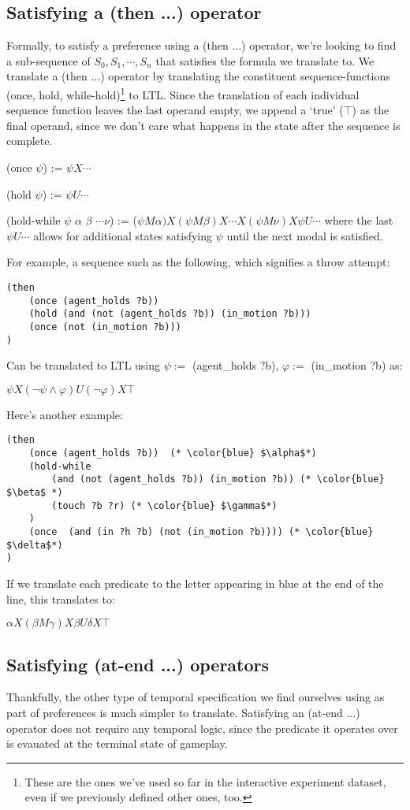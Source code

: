 \documentclass{article}
\begin{document}
\subsection{Satisfying a (then ...) operator}
Formally, to satisfy a preference using a (then ...) operator, we're looking to find a sub-sequence of $S_0, S_1, \cdots, S_n$ that satisfies the formula we translate to. 
We translate a (then ...) operator by translating the constituent sequence-functions (once, hold, while-hold)\footnote{These are the ones we've used so far in the interactive experiment dataset, even if we previously defined other ones, too.} to LTL. 
Since the translation of each individual sequence function leaves the last operand empty, we append a `true' ($\top$) as the final operand, since we don't care what happens in the state after the sequence is complete. 

(once $\psi$) := $\psi X \cdots$

(hold $\psi$) := $\psi U \cdots$

(hold-while $\psi$ $\alpha$ $\beta$ $\cdots \nu$) := ($\psi M \alpha) X (\psi M \beta) X \cdots X (\psi M \nu) X \psi U \cdots$ where the last $\psi U \cdots$ allows for additional states satisfying $\psi$ until the next modal is satisfied.

For example, a sequence such as the following, which signifies a throw attempt:
\begin{lstlisting}
(then
    (once (agent_holds ?b))
    (hold (and (not (agent_holds ?b)) (in_motion ?b))) 
    (once (not (in_motion ?b)))
)
\end{lstlisting}
Can be translated to LTL using $\psi:=$ (agent_holds ?b), $\varphi:=$ (in_motion ?b) as:

$\psi X (\neg \psi \wedge \varphi) U (\neg \varphi) X \top $

Here's another example: 
\begin{lstlisting}
(then 
    (once (agent_holds ?b))  (* \color{blue} $\alpha$*)
    (hold-while 
        (and (not (agent_holds ?b)) (in_motion ?b)) (* \color{blue} $\beta$ *)
        (touch ?b ?r) (* \color{blue} $\gamma$*)
    ) 
    (once  (and (in ?h ?b) (not (in_motion ?b)))) (* \color{blue} $\delta$*) 
)
\end{lstlisting}
If we translate each predicate to the letter appearing in blue at the end of the line, this translates to:

$\alpha X (\beta M \gamma) X \beta U \delta X \top$

\subsection{Satisfying (at-end ...) operators}
Thankfully, the other type of temporal specification we find ourselves using as part of preferences is much simpler to translate. 
Satisfying an (at-end ...) operator does not require any temporal logic, since the predicate it operates over is evauated at the terminal state of gameplay.
\end{document}
